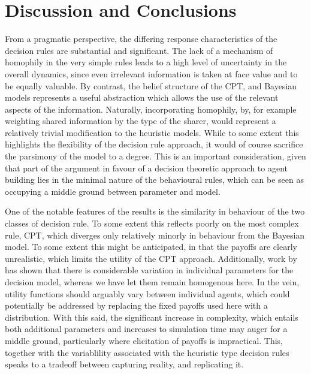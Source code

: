 \section{Discussion and Conclusions}
\label{sec:conclusion}
%

From a pragmatic perspective, the differing response characteristics of the decision rules are substantial and significant. The lack of a mechanism of homophily in the very simple rules leads to a high level of uncertainty in the overall dynamics, since even irrelevant information is taken at face value and to be equally valuable. By contrast, the belief structure of the \ac{CPT}, and Bayesian models represents a useful abstraction which allows the use of the relevant aspects of the information.  Naturally, incorporating homophily, by, for example weighting shared information by the type of the sharer, would represent a relatively trivial modification to the heuristic models. While to some extent this highlights the flexibility of the decision rule approach, it would of course sacrifice the parsimony of the model to a degree. This is an important consideration, given that part of the argument in favour of a decision theoretic approach to agent building lies in the minimal nature of the behavioural rules, which can be seen as occupying a middle ground between parameter and model.

One of the notable features of the results is the similarity in behaviour of the two classes of decision rule. To some extent this reflects poorly on the most complex rule, \ac{CPT}, which diverges only relatively minorly in behaviour from the Bayesian model. To some extent this might be anticipated, in that the payoffs are clearly unrealistic, which limits the utility of the \ac{CPT} approach.  Additionally, work by \citet{Glockner2012} has shown that there is considerable variation in individual parameters for the decision model, whereas we have let them remain homogenous here. In the vein, utility functions should arguably vary between individual agents, which could potentially be addressed by replacing the fixed payoffs used here with a distribution.  With this said, the significant increase in complexity, which entails both additional parameters and increases to simulation time may auger for a middle ground, particularly where elicitation of payoffs is impractical.  This, together with the variablility associated with the heuristic type decision rules speaks to a tradeoff between capturing reality, and replicating it.

